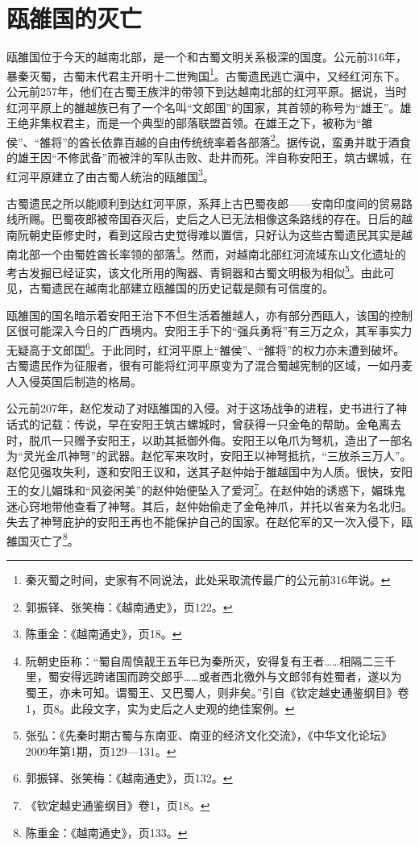 \section{瓯雒国的灭亡}

瓯雒国位于今天的越南北部，是一个和古蜀文明关系极深的国度。公元前316年，暴秦灭蜀，古蜀末代君主开明十二世殉国\footnote{秦灭蜀之时间，史家有不同说法，此处采取流传最广的公元前316年说。}。古蜀遗民逃亡滇中，又经红河东下。公元前257年，他们在古蜀王族泮的带领下到达越南北部的红河平原。据说，当时红河平原上的雒越族已有了一个名叫“文郎国”的国家，其首领的称号为“雄王”。雄王绝非集权君主，而是一个典型的部落联盟首领。在雄王之下，被称为“雒侯”、“雒将”的酋长依靠百越的自由传统统率着各部落\footnote{郭振铎、张笑梅：《越南通史》，页122。}。据传说，蛮勇并耽于酒食的雄王因“不修武备”而被泮的军队击败、赴井而死。泮自称安阳王，筑古螺城，在红河平原建立了由古蜀人统治的瓯雒国\footnote{陈重金：《越南通史》，页18。}。

古蜀遗民之所以能顺利到达红河平原，系拜上古巴蜀夜郎——安南印度间的贸易路线所赐。巴蜀夜郎被帝国吞灭后，史后之人已无法相像这条路线的存在。日后的越南阮朝史臣修史时，看到这段古史觉得难以置信，只好认为这些古蜀遗民其实是越南北部一个由蜀姓酋长率领的部落\footnote{阮朝史臣称：“蜀自周慎靓王五年已为秦所灭，安得复有王者……相隔二三千里，蜀安得远跨诸国而跨交郎乎……或者西北徼外与文郎邻有姓蜀者，遂以为蜀王，亦未可知。谓蜀王、又巴蜀人，则非矣。”引自《钦定越史通鉴纲目》卷1，页8。此段文字，实为史后之人史观的绝佳案例。}。然而，对越南北部红河流域东山文化遗址的考古发掘已经证实，该文化所用的陶器、青铜器和古蜀文明极为相似\footnote{张弘：《先秦时期古蜀与东南亚、南亚的经济文化交流》，《中华文化论坛》2009年第1期，页129—131。}。由此可见，古蜀遗民在越南北部建立瓯雒国的历史记载是颇有可信度的。

瓯雒国的国名暗示着安阳王治下不但生活着雒越人，亦有部分西瓯人，该国的控制区很可能深入今日的广西境内。安阳王手下的“强兵勇将”有三万之众，其军事实力无疑高于文郎国\footnote{郭振铎、张笑梅：《越南通史》，页132。}。于此同时，红河平原上“雒侯”、“雒将”的权力亦未遭到破坏。古蜀遗民作为征服者，很有可能将红河平原变为了混合蜀越宪制的区域，一如丹麦人入侵英国后制造的格局。 

公元前207年，赵佗发动了对瓯雒国的入侵。对于这场战争的进程，史书进行了神话式的记载：传说，早在安阳王筑古螺城时，曾获得一只金龟的帮助。金龟离去时，脱爪一只赠予安阳王，以助其抵御外侮。安阳王以龟爪为弩机，造出了一部名为“灵光金爪神弩”的武器。赵佗军来攻时，安阳王以神弩抵抗，“三放杀三万人”。赵佗见强攻失利，遂和安阳王议和，送其子赵仲始于雒越国中为人质。很快，安阳王的女儿媚珠和“风姿闲美”的赵仲始便坠入了爱河\footnote{《钦定越史通鉴纲目》卷1，页18。}。在赵仲始的诱惑下，媚珠鬼迷心窍地带他查看了神弩。其后，赵仲始偷走了金龟神爪，并托以省亲为名北归。失去了神弩庇护的安阳王再也不能保护自己的国家。在赵佗军的又一次入侵下，瓯雒国灭亡了\footnote{陈重金：《越南通史》，页133。}。


